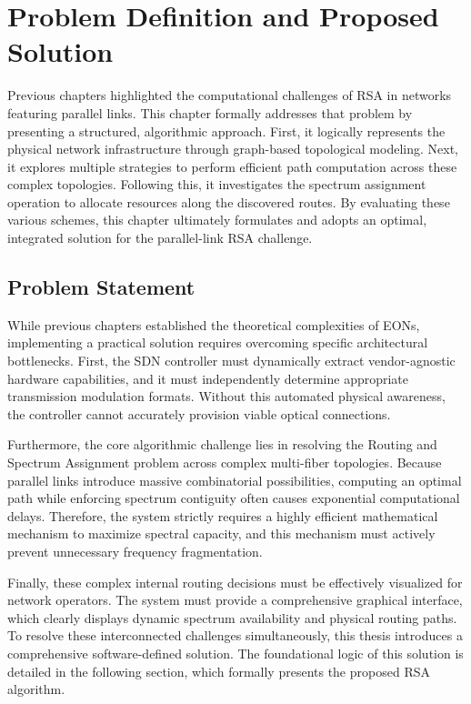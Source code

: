 \documentclass[12pt, a4paper, twoside, openright]{report}
\begin{document}
\chapter{Problem Definition and Proposed Solution}
Previous chapters highlighted the computational challenges of RSA in networks featuring parallel links. This chapter formally addresses that problem by presenting a structured, algorithmic approach. First, it logically represents the physical network infrastructure through graph-based topological modeling. Next, it explores multiple strategies to perform efficient path computation across these complex topologies. Following this, it investigates the spectrum assignment operation to allocate resources along the discovered routes. By evaluating these various schemes, this chapter ultimately formulates and adopts an optimal, integrated solution for the parallel-link RSA challenge.


\section{Problem Statement}
While previous chapters established the theoretical complexities of EONs, implementing a practical solution requires overcoming specific architectural bottlenecks. First, the SDN controller must dynamically extract vendor-agnostic hardware capabilities, and it must independently determine appropriate transmission modulation formats. Without this automated physical awareness, the controller cannot accurately provision viable optical connections.

Furthermore, the core algorithmic challenge lies in resolving the Routing and Spectrum Assignment problem across complex multi-fiber topologies. Because parallel links introduce massive combinatorial possibilities, computing an optimal path while enforcing spectrum contiguity often causes exponential computational delays. Therefore, the system strictly requires a highly efficient mathematical mechanism to maximize spectral capacity, and this mechanism must actively prevent unnecessary frequency fragmentation.

Finally, these complex internal routing decisions must be effectively visualized for network operators. The system must provide a comprehensive graphical interface, which clearly displays dynamic spectrum availability and physical routing paths. To resolve these interconnected challenges simultaneously, this thesis introduces a comprehensive software-defined solution. The foundational logic of this solution is detailed in the following section, which formally presents the proposed RSA algorithm.
\end{document}
